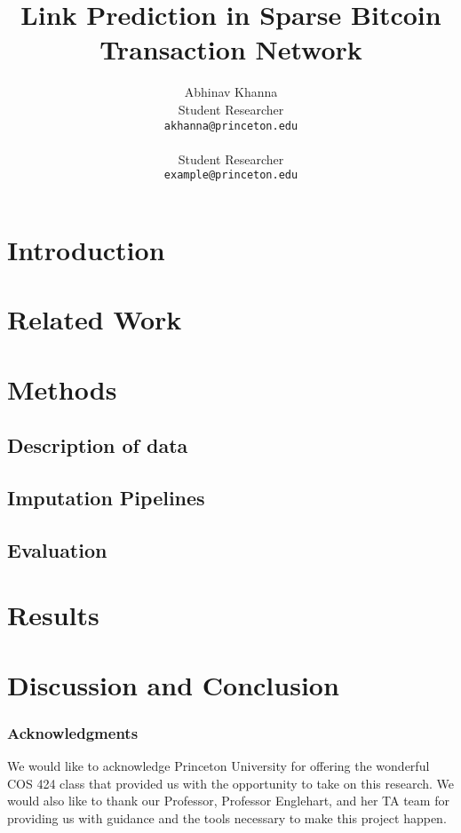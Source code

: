 \documentclass{article} %
\title{Link Prediction in Sparse Bitcoin Transaction Network}
\author{
Abhinav Khanna\\
Student Researcher\\
\texttt{akhanna@princeton.edu} \\
\And
 \\
Student Researcher \\
\texttt{example@princeton.edu} \\
}
\begin{document}
\maketitle

\begin{abstract}
\end{abstract}

\section{Introduction}

\section{Related Work}


\section{Methods}
\subsection{Description of data}
\subsection{Imputation Pipelines}
\subsection{Evaluation}
\section{Results}
\section{Discussion and Conclusion}
\subsubsection*{Acknowledgments}
We would like to acknowledge Princeton University for offering the wonderful COS 424 class that provided us with the opportunity to take on this research. We would also like to thank our Professor, Professor Englehart, and her TA team for providing us with guidance and the tools necessary to make this project happen.


\end{document}
